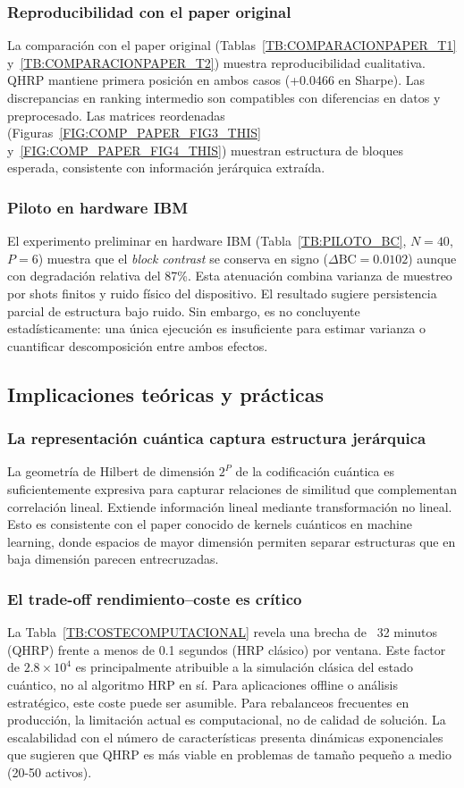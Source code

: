 \subsubsection{Reproducibilidad con el paper original}
La comparación con el paper original (Tablas~\ref{TB:COMPARACIONPAPER_T1} y~\ref{TB:COMPARACIONPAPER_T2}) muestra reproducibilidad cualitativa. QHRP mantiene primera posición en ambos casos (+0.0466 en Sharpe). Las discrepancias en ranking intermedio son compatibles con diferencias en datos y preprocesado. Las matrices reordenadas (Figuras~\ref{FIG:COMP_PAPER_FIG3_THIS} y~\ref{FIG:COMP_PAPER_FIG4_THIS}) muestran estructura de bloques esperada, consistente con información jerárquica extraída.

\subsubsection{Piloto en hardware IBM}
El experimento preliminar en hardware IBM (Tabla~\ref{TB:PILOTO_BC}, $N=40$, $P=6$) muestra que el \textit{block contrast} se conserva en signo ($\Delta\mathrm{BC} = 0.0102$) aunque con degradación relativa del 87\%. Esta atenuación combina varianza de muestreo por shots finitos y ruido físico del dispositivo. El resultado sugiere persistencia parcial de estructura bajo ruido. Sin embargo, es no concluyente estadísticamente: una única ejecución es insuficiente para estimar varianza o cuantificar descomposición entre ambos efectos.

\subsection{Implicaciones teóricas y prácticas}

\subsubsection{La representación cuántica captura estructura jerárquica}
La geometría de Hilbert de dimensión $2^P$ de la codificación cuántica es suficientemente expresiva para capturar relaciones de similitud que complementan correlación lineal. Extiende información lineal mediante transformación no lineal. Esto es consistente con el paper conocido de kernels cuánticos en machine learning, donde espacios de mayor dimensión permiten separar estructuras que en baja dimensión parecen entrecruzadas.

\subsubsection{El trade-off rendimiento--coste es crítico}
La Tabla~\ref{TB:COSTECOMPUTACIONAL} revela una brecha de ~32 minutos (QHRP) frente a menos de 0.1 segundos (HRP clásico) por ventana. Este factor de $2.8 \times 10^4$ es principalmente atribuible a la simulación clásica del estado cuántico, no al algoritmo HRP en sí. Para aplicaciones offline o análisis estratégico, este coste puede ser asumible. Para rebalanceos frecuentes en producción, la limitación actual es computacional, no de calidad de solución. La escalabilidad con el número de características presenta dinámicas exponenciales que sugieren que QHRP es más viable en problemas de tamaño pequeño a medio (20-50 activos).

